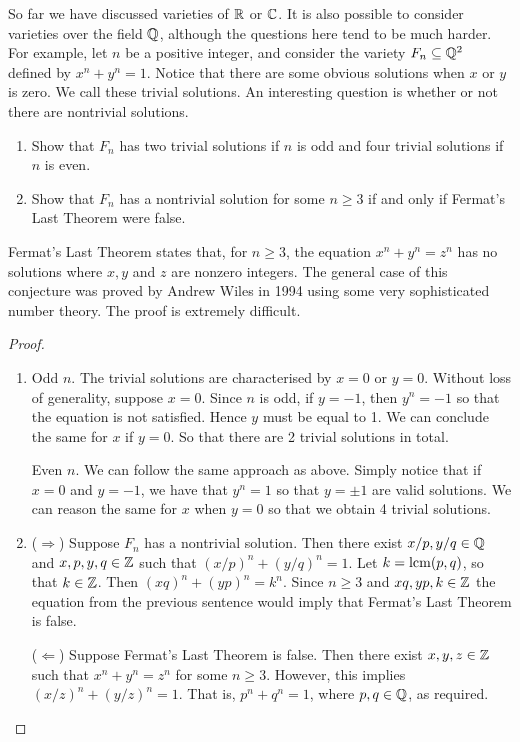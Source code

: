 \begin{exercise}{11}
So far we have discussed varieties of $\mathbb{R}$ or $\mathbb{C}$. 
It is also possible to consider varieties over the field $\mathbb{Q}$, although the questions here tend to be much harder. 
For example, let $n$ be a positive integer, and consider the variety $F_n\subseteq\mathbb{Q}^2$ defined by $x^n+y^n=1$. 
Notice that there are some obvious solutions when $x$ or $y$ is zero. 
We call these trivial solutions. 
An interesting question is whether or not there are nontrivial solutions.
\begin{enumerate}
    \item Show that $F_n$ has two trivial solutions if $n$ is odd and four trivial solutions if $n$ is even.
    \item Show that $F_n$ has a nontrivial solution for some $n\geq 3$ if and only if Fermat's Last Theorem were false.
\end{enumerate}
Fermat's Last Theorem states that, for $n\geq 3$, the equation $x^n+y^n=z^n$ has no solutions where $x,y$ and $z$ are nonzero integers. 
The general case of this conjecture was proved by Andrew Wiles in 1994 using some very sophisticated number theory. 
The proof is extremely difficult.
\end{exercise}
\begin{proof}
    \begin{enumerate}
        \item Odd $n$. 
        The trivial solutions are characterised by $x=0$ or $y=0$. 
        Without loss of generality, suppose $x=0$. Since $n$ is odd, if $y=-1$, then $y^n=-1$ so that the equation is not satisfied. 
        Hence $y$ must be equal to 1. 
        We can conclude the same for $x$ if $y=0$. 
        So that there are 2 trivial solutions in total.

        Even $n$. 
        We can follow the same approach as above. 
        Simply notice that if $x=0$ and $y=-1$, we have that $y^n=1$ so that  $y=\pm1$ are valid solutions. 
        We can reason the same for $x$ when $y=0$ so that we obtain 4 trivial solutions.
        \item ($\Rightarrow$) Suppose $F_n$ has a nontrivial solution. 
        Then there exist $x/p,y/q\in\mathbb{Q}$ and $x,p,y,q\in\mathbb{Z}$ such that $(x/p)^n+(y/q)^n = 1$. 
        Let $k=\operatorname*{lcm}(p,q)$, so that $k\in\mathbb{Z}$. 
        Then $(xq)^n+(yp)^n=k^n$. 
        Since $n\geq 3$ and $xq,yp,k\in\mathbb{Z}$ the equation from the previous sentence would imply that Fermat's Last Theorem is false.

        ($\Leftarrow$) Suppose Fermat's Last Theorem is false. 
        Then there exist $x,y,z\in\mathbb{Z}$ such that $x^n+y^n=z^n$ for some $n\geq 3$. 
        However, this implies $(x/z)^n+(y/z)^n=1$. 
        That is, $p^n+q^n=1$, where $p,q\in\mathbb{Q}$, as required.
    \end{enumerate}
\end{proof}

